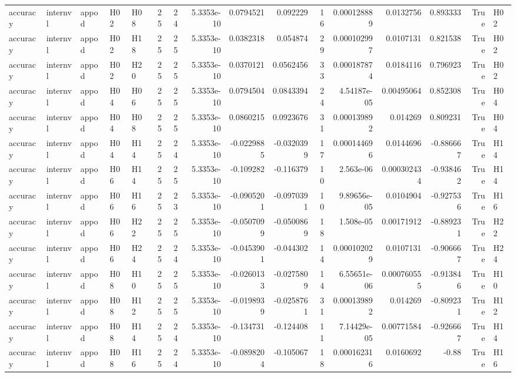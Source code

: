 \begin{longtable}{lllllrrrrrrrrrrl}
accuracy & internvl & appod & H02 & H08 & 25 & 24 & 5.3353e-10 & 0.0794521 & 0.092229 & 16 & 0.000128889 & 0.0132756 & 0.893333 & True & H02 \\
accuracy & internvl & appod & H02 & H18 & 25 & 25 & 5.3353e-10 & 0.0382318 & 0.054874 & 29 & 0.000102997 & 0.0107131 & 0.821538 & True & H02 \\
accuracy & internvl & appod & H02 & H20 & 25 & 25 & 5.3353e-10 & 0.0370121 & 0.0562456 & 33 & 0.000187874 & 0.0184116 & 0.796923 & True & H02 \\
accuracy & internvl & appod & H04 & H06 & 25 & 25 & 5.3353e-10 & 0.0794504 & 0.0843394 & 24 & 4.54187e-05 & 0.00495064 & 0.852308 & True & H04 \\
accuracy & internvl & appod & H04 & H08 & 25 & 25 & 5.3353e-10 & 0.0860215 & 0.0923676 & 31 & 0.000139892 & 0.014269 & 0.809231 & True & H04 \\
accuracy & internvl & appod & H04 & H14 & 25 & 24 & 5.3353e-10 & -0.0229885 & -0.0320399 & 17 & 0.000144696 & 0.0144696 & -0.886667 & True & H14 \\
accuracy & internvl & appod & H06 & H14 & 25 & 25 & 5.3353e-10 & -0.109282 & -0.116379 & 10 & 2.563e-06 & 0.000302434 & -0.938462 & True & H14 \\
accuracy & internvl & appod & H06 & H16 & 25 & 23 & 5.3353e-10 & -0.0905201 & -0.0970391 & 10 & 9.89656e-05 & 0.0104904 & -0.927536 & True & H16 \\
accuracy & internvl & appod & H06 & H22 & 25 & 25 & 5.3353e-10 & -0.0507099 & -0.0500869 & 18 & 1.508e-05 & 0.00171912 & -0.889231 & True & H22 \\
accuracy & internvl & appod & H06 & H24 & 25 & 24 & 5.3353e-10 & -0.0453901 & -0.044302 & 14 & 0.000102029 & 0.0107131 & -0.906667 & True & H24 \\
accuracy & internvl & appod & H08 & H10 & 25 & 25 & 5.3353e-10 & -0.0260133 & -0.0275809 & 14 & 6.55651e-06 & 0.000760555 & -0.913846 & True & H10 \\
accuracy & internvl & appod & H08 & H12 & 25 & 25 & 5.3353e-10 & -0.0198939 & -0.0258761 & 31 & 0.000139892 & 0.014269 & -0.809231 & True & H12 \\
accuracy & internvl & appod & H08 & H14 & 25 & 24 & 5.3353e-10 & -0.134731 & -0.124408 & 11 & 7.14429e-05 & 0.00771584 & -0.926667 & True & H14 \\
accuracy & internvl & appod & H08 & H16 & 25 & 24 & 5.3353e-10 & -0.0898204 & -0.105067 & 18 & 0.000162316 & 0.0160692 & -0.88 & True & H16 \\

\end{longtable}
